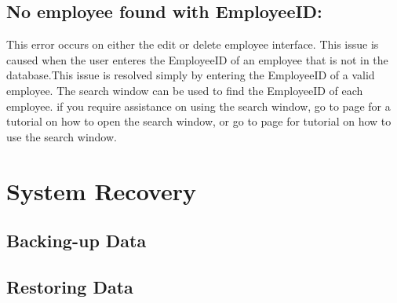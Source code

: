 \subsection{No employee found with EmployeeID:}

This error occurs on either the edit or delete employee interface. This issue is caused when the user enteres the EmployeeID of an employee that is not in the database.This issue is resolved simply by entering the EmployeeID of a valid employee. The search window can be used to find the EmployeeID of each employee. if you require assistance on using the search window, go to page \pageref{fig:Accessing the search window} for a tutorial on how to open the search window, or go to page \pageref{fig:Using the search window} for tutorial on how to use the search window.



\section{System Recovery}

\subsection{Backing-up Data}

\subsection{Restoring Data}





